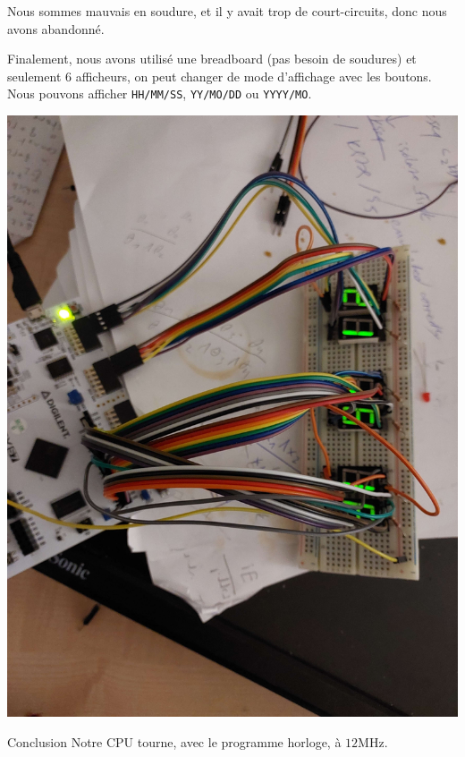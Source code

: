 \documentclass{beamer}
\begin{document}
\begin{frame}[fragile]
  Nous sommes mauvais en soudure, et il y avait trop de court-circuits,
  donc nous avons abandonné.\par
  Finalement, nous avons utilisé une breadboard (pas besoin de
  soudures) et seulement 6 afficheurs, on peut changer de mode
  d'affichage avec les boutons. Nous pouvons afficher \verb|HH/MM/SS|,
  \verb|YY/MO/DD| ou \verb|YYYY/MO|.
  \begin{center}
    \includegraphics[angle=90,scale=0.04]{pictures/FPGA final.jpg}
  \end{center}
\end{frame}
\begin{frame}{Conclusion}
  Notre CPU tourne, avec le programme horloge, à \(12\mathrm{MHz}\).
\end{frame}
\end{document}
